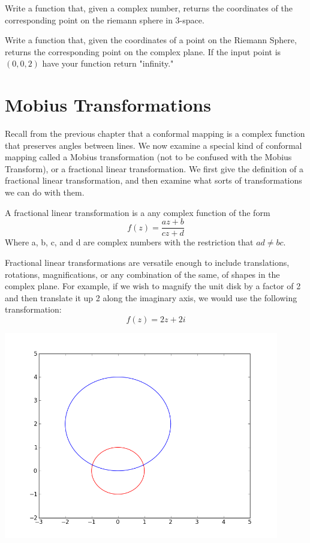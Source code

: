 \begin{problem}  Write a function that, given a complex number, returns the coordinates of the corresponding point on the riemann sphere in 3-space.
\end{problem}

\begin{problem}
Write a function that, given the coordinates of a point on the Riemann Sphere, returns the corresponding point on the complex plane. If the input point is $(0,0,2)$ have your function return "infinity."
\end{problem}

\section*{Mobius Transformations}

Recall from the previous chapter that a conformal mapping is a complex function that preserves angles between lines.  We now examine a special kind of conformal mapping called a Mobius transformation (not to be confused with the Mobius Transform), or a fractional linear transformation.  We first give the definition of a fractional linear transformation, and then examine what sorts of transformations we can do with them.

\begin{definition}  A fractional linear transformation is a any complex function of the form
\[
f(z) = \frac{az + b}{cz + d}
\]
 Where a, b, c, and d are complex numbers with the restriction that $ad \neq bc$.
\end{definition}

Fractional linear transformations are versatile enough to include translations, rotations, magnifications, or any combination of the same, of shapes in the complex plane.  For example, if we wish to magnify the unit disk by a factor of 2 and then translate it up 2 along the imaginary axis, we would use the following transformation:
\[
f(z)=2z+2i
\]

\includegraphics[width=120mm]{mobius1.png}

